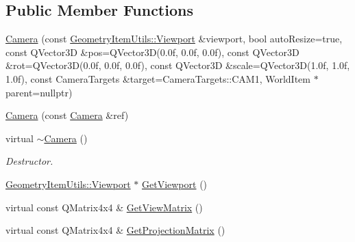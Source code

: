 \subsection*{Public Member Functions}
\begin{DoxyCompactItemize}
\item 
\mbox{\hyperlink{class_geometry_engine_1_1_geometry_world_item_1_1_geometry_camera_1_1_camera_ad83b44011bb54382c3d99b2d936a27f9}{Camera}} (const \mbox{\hyperlink{class_geometry_engine_1_1_geometry_item_utils_1_1_viewport}{Geometry\+Item\+Utils\+::\+Viewport}} \&viewport, bool auto\+Resize=true, const Q\+Vector3D \&pos=Q\+Vector3D(0.\+0f, 0.\+0f, 0.\+0f), const Q\+Vector3\+D \&rot=\+Q\+Vector3\+D(0.\+0f, 0.\+0f, 0.\+0f), const Q\+Vector3\+D \&scale=\+Q\+Vector3\+D(1.\+0f, 1.\+0f, 1.\+0f), const Camera\+Targets \&target=\+Camera\+Targets\+::\+C\+A\+M1, World\+Item $\ast$parent=nullptr)
\item 
\mbox{\hyperlink{class_geometry_engine_1_1_geometry_world_item_1_1_geometry_camera_1_1_camera_afac761f35401ea99ef72dd2412b71cfc}{Camera}} (const \mbox{\hyperlink{class_geometry_engine_1_1_geometry_world_item_1_1_geometry_camera_1_1_camera}{Camera}} \&ref)
\item 
\mbox{\label{class_geometry_engine_1_1_geometry_world_item_1_1_geometry_camera_1_1_camera_ae9c09265af967800c32373f9c79d56c6}} 
virtual \mbox{\hyperlink{class_geometry_engine_1_1_geometry_world_item_1_1_geometry_camera_1_1_camera_ae9c09265af967800c32373f9c79d56c6}{$\sim$\+Camera}} ()
\begin{DoxyCompactList}\small\item\em Destructor. \end{DoxyCompactList}\item 
\mbox{\hyperlink{class_geometry_engine_1_1_geometry_item_utils_1_1_viewport}{Geometry\+Item\+Utils\+::\+Viewport}} $\ast$ \mbox{\hyperlink{class_geometry_engine_1_1_geometry_world_item_1_1_geometry_camera_1_1_camera_af0cbe2d79ec50e1ecdec1e81be08163e}{Get\+Viewport}} ()
\item 
virtual const Q\+Matrix4x4 \& \mbox{\hyperlink{class_geometry_engine_1_1_geometry_world_item_1_1_geometry_camera_1_1_camera_a140ec366f6b9b9df8ed9134c612cbac6}{Get\+View\+Matrix}} ()
\item 
virtual const Q\+Matrix4x4 \& \mbox{\hyperlink{class_geometry_engine_1_1_geometry_world_item_1_1_geometry_camera_1_1_camera_ae08a02484b89c774a25f7f9aa783a026}{Get\+Projection\+Matrix}} ()

\end{DoxyCompactItemize}
